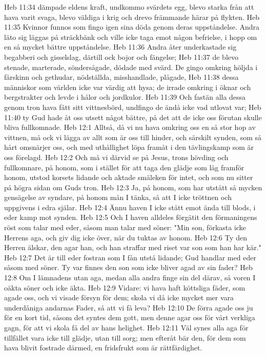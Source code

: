 Heb 11:34  dämpade eldens kraft, undkommo svärdets egg, blevo starka från att hava varit svaga, blevo väldiga i krig och drevo främmande härar på flykten.
Heb 11:35  Kvinnor funnos som fingo igen sina döda genom deras uppståndelse. Andra läto sig läggas på sträckbänk och ville icke taga emot någon befrielse, i hopp om en så mycket bättre uppståndelse.
Heb 11:36  Andra åter underkastade sig begabberi och gisselslag, därtill ock bojor och fängelse;
Heb 11:37  de blevo stenade, marterade, söndersågade, dödade med svärd. De gingo omkring höljda i fårskinn och gethudar, nödställda, misshandlade, plågade,
Heb 11:38  dessa människor som världen icke var värdig att hysa; de irrade omkring i öknar och bergstrakter och levde i hålor och jordkulor.
Heb 11:39  Och fastän alla dessa genom tron hava fått sitt vittnesbörd, undfingo de ändå icke vad utlovat var;
Heb 11:40  ty Gud hade åt oss utsett något bättre, på det att de icke oss förutan skulle bliva fullkomnade.
Heb 12:1  Alltså, då vi nu hava omkring oss en så stor hop av vittnen, må ock vi lägga av allt som är oss till hinder, och särskilt synden, som så hårt omsnärjer oss, och med uthållighet löpa framåt i den tävlingskamp som är oss förelagd.
Heb 12:2  Och må vi därvid se på Jesus, trons hövding och fullkomnare, på honom, som i stället för att taga den glädje som låg framför honom, utstod korsets lidande och aktade smäleken för intet, och som nu sitter på högra sidan om Guds tron.
Heb 12:3  Ja, på honom, som har utstått så mycken gensägelse av syndare, på honom mån I tänka, så att I icke tröttnen och uppgivens i edra själar.
Heb 12:4  Ännu haven I icke stått emot ända till blods, i eder kamp mot synden.
Heb 12:5  Och I haven alldeles förgätit den förmaningens röst som talar med eder, såsom man talar med söner: "Min son, förkasta icke Herrens aga, och giv dig icke över, när du tuktas av honom.
Heb 12:6  Ty den Herren älskar, den agar han, och han straffar med riset var son som han har kär."
Heb 12:7  Det är till eder fostran som I fån utstå lidande; Gud handlar med eder såsom med söner. Ty var finnes den son som icke bliver agad av sin fader?
Heb 12:8  Om I lämnadens utan aga, medan alla andra finge sin del därav, så voren I oäkta söner och icke äkta.
Heb 12:9  Vidare: vi hava haft köttsliga fäder, som agade oss, och vi visade försyn för dem; skola vi då icke mycket mer vara underdåniga andarnas Fader, så att vi få leva?
Heb 12:10  De förra agade oss ju för en kort tid, såsom det syntes dem gott, men denne agar oss för vårt verkliga gagn, för att vi skola få del av hans helighet.
Heb 12:11  Väl synes alla aga för tillfället vara icke till glädje, utan till sorg; men efteråt bär den, för dem som hava blivit fostrade därmed, en fridsfrukt som är rättfärdighet.
